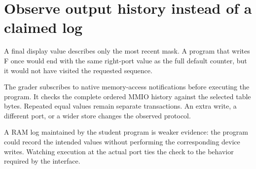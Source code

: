 \section{Observe output history instead of a claimed
  log}\label{005-seven-segment-counter-p08-observe-output-history-instead-of-a-claimed-log}

A final display value describes only the most recent mask. A program
that writes F once would end with the same right-port value as the full
default counter, but it would not have visited the requested sequence.

The grader subscribes to native memory-access notifications before
executing the program. It checks the complete ordered MMIO history
against the selected table bytes. Repeated equal values remain separate
transactions. An extra write, a different port, or a wider store changes
the observed protocol.

A RAM log maintained by the student program is weaker evidence: the
program could record the intended values without performing the
corresponding device writes. Watching execution at the actual port ties
the check to the behavior required by the interface.
